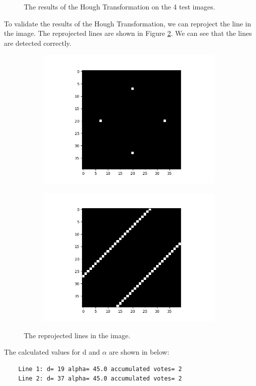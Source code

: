 \documentclass[12pt
,headinclude
,headsepline
,bibtotocnumbered
]{scrartcl}
\begin{document}
\begin{figure}[H]
\begin{subfigure}{0.45\textwidth}
    \end{subfigure}
    \caption{The results of the Hough Transformation on the 4 test images.
    }
    \label{fig:1}
\end{figure}
To validate the results of the Hough Transformation, we can reproject the line in the image. The reprojected lines are shown in Figure \ref{fig:2}. We can see that the lines are detected correctly.
\begin{figure}[H]
    \centering
    \begin{subfigure}{0.45\textwidth}
        \includegraphics[width=1.25\textwidth]{plots/4points.png}
    \end{subfigure}
    \hfill
    \begin{subfigure}{0.45\textwidth}
        \includegraphics[width=1.25\textwidth]{plots/redraw.png}
    \end{subfigure}
    \caption{The reprojected lines in the image.}
    \label{fig:2}
\end{figure}
The calculated values for d and $\alpha$ are shown in below:
\begin{verbatim}
    Line 1: d= 19 alpha= 45.0 accumulated votes= 2
    Line 2: d= 37 alpha= 45.0 accumulated votes= 2
\end{verbatim}
\end{document}
